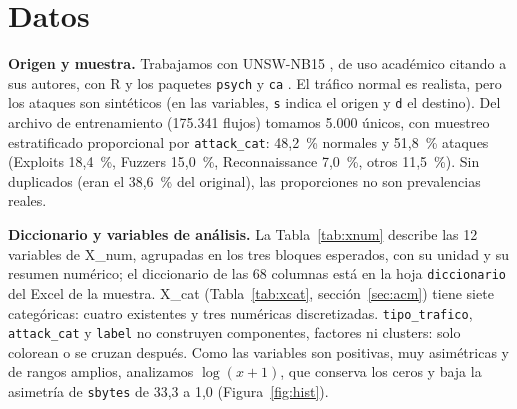 \section{Datos}
\label{sec:datos}

\textbf{Origen y muestra.} Trabajamos con UNSW-NB15 \citep{moustafa2015,moustafa2016}, de uso académico citando a sus autores, con R \citep{rcore2024} y los paquetes \texttt{psych} y \texttt{ca} \citep{nenadic2007}. El tráfico normal es realista, pero los ataques son sintéticos (en las variables, \texttt{s} indica el origen y \texttt{d} el destino). Del archivo de entrenamiento (175.341 flujos) tomamos 5.000 únicos, con muestreo estratificado proporcional por \texttt{attack\_cat}: 48,2~\% normales y 51,8~\% ataques (Exploits 18,4~\%, Fuzzers 15,0~\%, Reconnaissance 7,0~\%, otros 11,5~\%). Sin duplicados (eran el 38,6~\% del original), las proporciones no son prevalencias reales.

\textbf{Diccionario y variables de análisis.} La Tabla~\ref{tab:xnum} describe las 12 variables de X\_num, agrupadas en los tres bloques esperados, con su unidad y su resumen numérico; el diccionario de las 68 columnas está en la hoja \texttt{diccionario} del Excel de la muestra. X\_cat (Tabla~\ref{tab:xcat}, sección~\ref{sec:acm}) tiene siete categóricas: cuatro existentes y tres numéricas discretizadas. \texttt{tipo\_trafico}, \texttt{attack\_cat} y \texttt{label} no construyen componentes, factores ni clusters: solo colorean o se cruzan después. Como las variables son positivas, muy asimétricas y de rangos amplios, analizamos $\log(x+1)$, que conserva los ceros y baja la asimetría de \texttt{sbytes} de 33,3 a 1,0 (Figura~\ref{fig:hist}).

